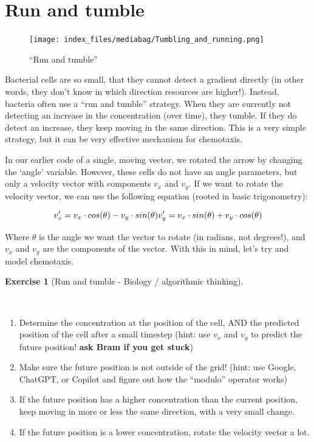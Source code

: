 \documentclass[
  letterpaper,
  DIV=11,
  numbers=noendperiod]{scrreprt}
\providecommand{\tightlist}{%
  \setlength{\itemsep}{0pt}\setlength{\parskip}{0pt}}\usepackage{longtable,booktabs,array}
\theoremstyle{definition}
\newtheorem{exercise}{Exercise}[chapter]
\theoremstyle{remark}
\begin{document}
\section{Run and tumble}\label{sec-runandtumble}

\begin{figure}[H]

{\centering \texttt{[image: index\_files/mediabag/Tumbling\_and\_running.png]}

}

\caption{``Run and tumble''}

\end{figure}%

Bacterial cells are so small, that they cannot detect a gradient
directly (in other words, they don't know in which direction resources
are higher!). Instead, bacteria often use a ``run and tumble'' strategy.
When they are currently not detecting an increase in the concentration
(over time), they tumble. If they do detect an increase, they keep
moving in the same direction. This is a very simple strategy, but it can
be very effective mechanism for chemotaxis.

In our earlier code of a single, moving vector, we rotated the arrow by
changing the `angle' variable. However, these cells do not have an angle
parameters, but only a velocity vector with components \(v_x\) and
\(v_y\). If we want to rotate the velocity vector, we can use the
following equation (rooted in basic trigonometry):

\[
v_x' = v_x \cdot cos(\theta) - v_y \cdot sin(\theta) \\
v_y' = v_x \cdot sin(\theta) + v_y \cdot cos(\theta)
\]

Where \(\theta\) is the angle we want the vector to rotate (in radians,
not degrees!), and \(v_x\) and \(v_y\) are the components of the vector.
With this in mind, let's try and model chemotaxis.

\begin{exercise}[Run and tumble - Biology / algorithmic
thinking]\protect\hypertarget{exr-steering}{}\label{exr-steering}

~

\begin{enumerate}
\def\labelenumi{\alph{enumi}.}
\tightlist
\item
  Determine the concentration at the position of the cell, AND the
  predicted position of the cell after a small timestep (hint: use
  \(v_x\) and \(v_y\) to predict the future position! \textbf{ask Bram
  if you get stuck})
\item
  Make sure the future position is not outside of the grid! (hint: use
  Google, ChatGPT, or Copilot and figure out how the ``modulo'' operator
  works)
\item
  If the future position has a higher concentration than the current
  position, keep moving in more or less the same direction, with a very
  small change.
\item
  If the future position is a lower concentration, rotate the velocity
  vector a lot.
\end{enumerate}

\end{exercise}
\end{document}

